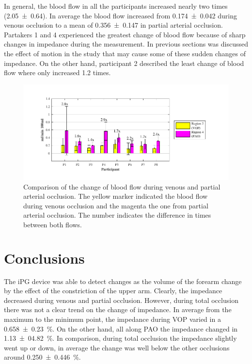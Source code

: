In general, the blood flow in all the participants increased nearly two times (\num{2.05(064)}). In average the blood flow increased from \SI{0.174(0042)}{\bfv} during venous occlusion to a mean of \SI{0.356(0147)}{\bfv} in partial arterial occlusion. Partakers 1 and 4 experienced the greatest change of blood flow because of sharp changes in impedance during the measurement. In previous sections was discussed the effect of motion in the study that may cause some of these sudden changes of impedance. On the other hand, participant 2 described the least change of blood flow where only increased 1.2 times. 

\begin{figure}[!htpb]
	\includegraphics[width=\textwidth,clip]{figure_vop_12}    
	\caption[Comparison of the change of blood flow during venous and partial arterial occlusion]{Comparison of the change of blood flow during venous and partial arterial occlusion. The yellow marker indicated the blood flow during venous occlusion and the magenta the one from partial arterial occlusion. The number indicates the difference in times between both flows.}
	\label{fig:iPG_flow_comparative}
\end{figure}


\section{Conclusions}
\label{section occlusion 3}
The iPG device was able to detect changes as the volume of the forearm change by the effect of the constriction of the upper arm. Clearly, the impedance decreased during venous and partial occlusion. However, during total occlusion there was not a clear trend on the change of impedance. In average from the maximum to the minimum point, the impedance during VOP varied in a \SI{0.658(0230)}{\percent}. On the other hand, all along PAO the impedance changed in \SI{1.13(0482)}{\percent}. In comparison, during total occlusion the impedance slightly went up or down, in average the change was well below the other occlusions around \SI{0.250(0446)}{\percent}. 

